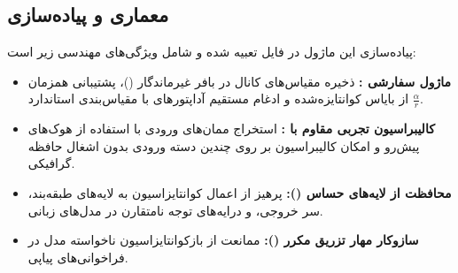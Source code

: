 \subsection{معماری و پیاده‌سازی}
پیاده‌سازی این ماژول در فایل  تعبیه شده و شامل ویژگی‌های مهندسی زیر است:
\begin{itemize}
    \item \textbf{ماژول سفارشی :} ذخیره مقیاس‌های کانال در بافر غیرماندگار ()، پشتیبانی همزمان از بایاس کوانتایزه‌شده و ادغام مستقیم آداپتورهای  با مقیاس‌بندی استاندارد $\frac{\alpha}{r}$.
    \item \textbf{کالیبراسیون تجربی مقاوم با :} استخراج ممان‌های ورودی با استفاده از هوک‌های پیش‌رو و امکان کالیبراسیون بر روی چندین دسته ورودی بدون اشغال حافظه گرافیکی.
    \item \textbf{محافظت از لایه‌های حساس ():} پرهیز از اعمال کوانتایزاسیون به لایه‌های طبقه‌بند، سر خروجی، و درایه‌های توجه نامتقارن  در مدل‌های زبانی.
    \item \textbf{سازوکار مهار تزریق مکرر ():} ممانعت از بازکوانتایزاسیون ناخواسته مدل در فراخوانی‌های پیاپی.
\end{itemize}
